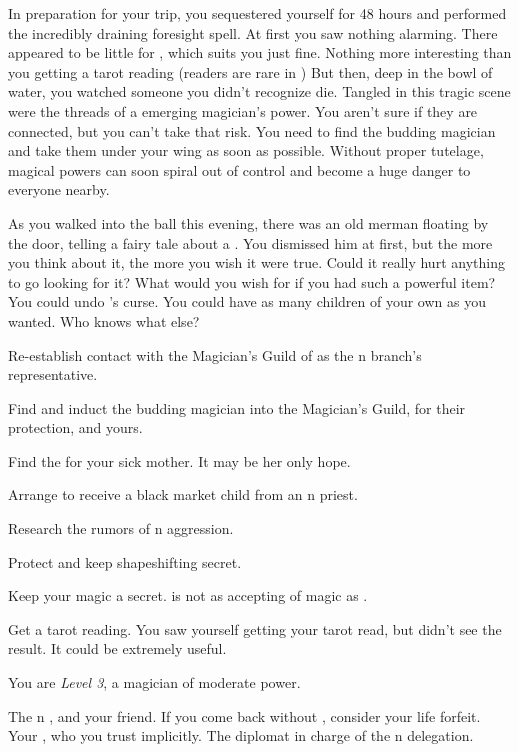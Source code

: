 \documentclass[char]{NeptuneBall}
\begin{document}
In preparation for your trip, you sequestered yourself for 48 hours and performed the incredibly draining foresight spell. At first you saw nothing alarming. There appeared to be little for \cPrince{}, which suits you just fine. Nothing more interesting than you getting a tarot reading (readers are rare in \pPacifica{}) But then, deep in the bowl of water, you watched someone you didn't recognize die. Tangled in this tragic scene were the threads of a emerging magician's power. You aren't sure if they are connected, but you can't take that risk. You need to find the budding magician and take them under your wing as soon as possible. Without proper tutelage, magical powers can soon spiral out of control and become a huge danger to everyone nearby.

As you walked into the ball this evening, there was an old merman floating by the door, telling a fairy tale about a \iWishingStone{\MYname}. You dismissed him at first, but the more you think about it, the more you wish it were true. Could it really hurt anything to go looking for it? What would you wish for if you had such a powerful item? You could undo \cPrince{}'s curse. You could have as many children of your own as you wanted. Who knows what else?

\begin{itemz}[Goals]
  \item Re-establish contact with the Magician's Guild of \pAtlantis{} as the \pPacifica{}n branch's representative.
  \item Find and induct the budding magician into the Magician's Guild, for their protection, and yours.
	\item Find the \iWishingStone{} for your sick mother. It may be her only hope.
  \item Arrange to receive a black market child from an \pAtlantis{}n priest.
  \item Research the rumors of \pIndia{}n aggression.
  \item Protect \cPrince{} and keep \cPrince{\their} shapeshifting secret.
	\item Keep your magic a secret. \pAtlantis{} is not as accepting of magic as \pPacifica{}.
	\item Get a tarot reading. You saw yourself getting your tarot read, but didn't see the result. It could be extremely useful.
\end{itemz}

\begin{itemz}[Notes]
	\item You are \emph{Level 3}, a magician of moderate power.
\end{itemz}

\begin{contacts}
  \contact{\cPrince{}} The \pPacifica{}n \cPrince{\Prince}, and your friend. If you come back without \cPrince{\them}, consider your life forfeit.
  \contact{\cSpy{}} Your \cSpy{\sibling}, who you trust implicitly.
  \contact{\cDiplomat{}} The diplomat in charge of the \pPacifica{}n delegation.
\end{contacts}
\end{document}

